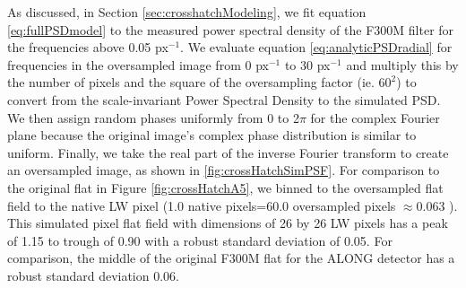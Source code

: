 \documentclass[]{aastex62}
\begin{document}
As discussed, in Section \ref{sec:crosshatchModeling}, we fit equation \ref{eq:fullPSDmodel} to the measured power spectral density of the F300M filter for the frequencies above 0.05 px$^{-1}$.
We evaluate equation \ref{eq:analyticPSDradial} for frequencies in the oversampled image from 0 px$^{-1}$ to 30 px$^{-1}$ and multiply this by the number of pixels and the square of the oversampling factor (ie. $60^2$) to convert from the scale-invariant Power Spectral Density to the simulated PSD.
We then assign random phases uniformly from 0 to 2$\pi$ for the complex Fourier plane because the original image's complex phase distribution is similar to uniform.
Finally, we take the real part of the inverse Fourier transform to create an oversampled image, as shown in \ref{fig:crossHatchSimPSF}.
For comparison to the original flat in Figure \ref{fig:crossHatchA5}, we binned to the oversampled flat field to the native LW pixel (1.0 native pixels=60.0 oversampled pixels $\approx$0.063 \arcsec).
This simulated pixel flat field with dimensions of 26 by 26 LW pixels has a peak of 1.15 to trough of 0.90 with a robust standard deviation of 0.05.
For comparison, the middle of the original F300M flat for the ALONG detector has a robust standard deviation 0.06.
\end{document}
